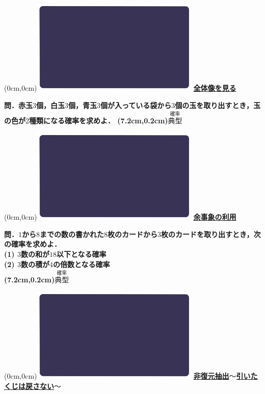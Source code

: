 \documentclass[10pt,
fleqn,
dvipdfmx,
uplatex
]{jsarticle}
\begin{document}
\newpage



\at(0cm,0cm){\includegraphics[width=8cm,bb=0 0 1920 1080]{./youtube/thumbnails/templates/smart_background/確率.jpeg}}
{\color{orange}\bf\boldmath\huge\underline{全体像を見る}}\vspace{0.3zw}

\Large 
\bf\boldmath 問．赤玉$3$個，白玉$3$個，青玉$3$個が入っている袋から$3$個の玉を取り出すとき，玉の色が$2$種類になる確率を求めよ．
\at(7.2cm,0.2cm){\small\color{bradorange}$\overset{\text{確率}}{\text{典型}}$}


\newpage



\at(0cm,0cm){\includegraphics[width=8cm,bb=0 0 1920 1080]{./youtube/thumbnails/templates/smart_background/確率.jpeg}}
{\color{orange}\bf\boldmath\huge\underline{余事象の利用}}\vspace{0.3zw}

\normalsize 
\bf\boldmath 問．$1$から$8$までの数の書かれた$8$枚のカードから$3$枚のカードを取り出すとき，次の確率を求めよ．\\
(1)  $3$数の和が${18}$以下となる確率\\
(2)  $3$数の積が$4$の倍数となる確率\\

\at(7.2cm,0.2cm){\small\color{bradorange}$\overset{\text{確率}}{\text{典型}}$}


\newpage



\at(0cm,0cm){\includegraphics[width=8cm,bb=0 0 1920 1080]{./youtube/thumbnails/templates/smart_background/確率.jpeg}}
{\color{orange}\bf\boldmath\normalsize\underline{非復元抽出$〜$引いたくじは戻さない$〜$}}\vspace{0.3zw}
\end{document}
